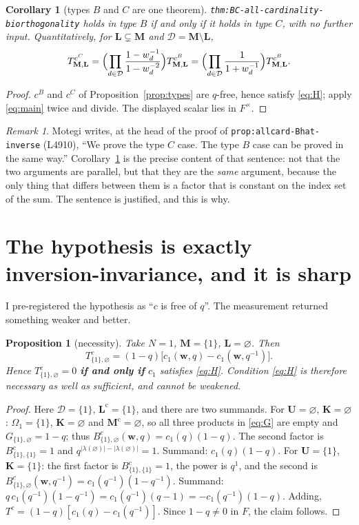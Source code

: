 \documentclass[11pt]{article}
\theoremstyle{plain}
\newtheorem{prop}[thm]{Proposition}
\newtheorem{cor}[thm]{Corollary}
\theoremstyle{definition}
\theoremstyle{remark}
\newtheorem{rem}[thm]{Remark}
\newcommand{\bM}{\mathbf M}
\newcommand{\bK}{\mathbf K}
\newcommand{\bL}{\mathbf L}
\newcommand{\bU}{\mathbf U}
\newcommand{\bw}{\mathbf w}
\newcommand{\cD}{\mathcal D}
\newcommand{\cm}{{\mathrm c}}
\begin{document}
\begin{cor}[types $B$ and $C$ are one theorem]
\label{cor:BC}
\texttt{thm:BC-all-cardinality-biorthogonality} holds in type $B$ if and only if
it holds in type $C$, with no further input. Quantitatively, for
$\bL\subsetneq\bM$ and $\cD=\bM\setminus\bL$,
\[
T^{c^C}_{\bM,\bL}
=\Bigl(\prod_{d\in\cD}\frac{1-w_d^{-1}}{1-w_d^{-2}}\Bigr)T^{c^B}_{\bM,\bL}
=\Bigl(\prod_{d\in\cD}\frac1{1+w_d^{-1}}\Bigr)T^{c^B}_{\bM,\bL}.
\]
\end{cor}

\begin{proof}
$c^B$ and $c^C$ of Proposition~\ref{prop:types} are $q$-free, hence satisfy
\eqref{eq:H}; apply \eqref{eq:main} twice and divide. The displayed scalar lies in
$F^\times$.
\end{proof}

\begin{rem}
Motegi writes, at the head of the proof of \texttt{prop:allcard-Bhat-inverse}
(L4910), ``We prove the type $C$ case. The type $B$ case can be proved in the same
way.'' Corollary~\ref{cor:BC} is the precise content of that sentence: not that
the two arguments are parallel, but that they are the \emph{same} argument, because
the only thing that differs between them is a factor that is constant on the index
set of the sum. The sentence is justified, and this is why.
\end{rem}

\section{The hypothesis is exactly inversion-invariance, and it is sharp}
\label{sec:sharp}

I pre-registered the hypothesis as ``$c$ is free of $q$''. The measurement
returned something weaker and better.

\begin{prop}[necessity]
\label{prop:sharp}
Take $N=1$, $\bM=\{1\}$, $\bL=\varnothing$. Then
\[
T^c_{\{1\},\varnothing}=(1-q)\bigl[c_1(\bw,q)-c_1(\bw,q^{-1})\bigr].
\]
Hence $T^c_{\{1\},\varnothing}=0$ \textbf{if and only if} $c_1$ satisfies
\eqref{eq:H}. Condition \eqref{eq:H} is therefore necessary as well as
sufficient, and cannot be weakened.
\end{prop}

\begin{proof}
Here $\cD=\{1\}$, $\bL^\cm=\{1\}$, and there are two summands.
For $\bU=\varnothing$, $\bK=\varnothing$: $\Omega_1=\{1\}$, $\bK=\varnothing$ and
$\bM^\cm=\varnothing$, so all three products in \eqref{eq:G} are empty and
$G_{\{1\},\varnothing}=1-q$; thus $B^c_{\{1\},\varnothing}(\bw,q)=c_1(q)(1-q)$.
The second factor is $B^c_{\{1\},\{1\}}=1$ and $q^{|\lambda(\varnothing)|-|\lambda(\varnothing)|}=1$.
Summand: $c_1(q)(1-q)$.
For $\bU=\{1\}$, $\bK=\{1\}$: the first factor is $B^c_{\{1\},\{1\}}=1$, the power is
$q^{1}$, and the second is $B^c_{\{1\},\varnothing}(\bw,q^{-1})=c_1(q^{-1})(1-q^{-1})$.
Summand: $q\,c_1(q^{-1})(1-q^{-1})=c_1(q^{-1})(q-1)=-c_1(q^{-1})(1-q)$.
Adding, $T^c=(1-q)[c_1(q)-c_1(q^{-1})]$. Since $1-q\ne0$ in $F$, the claim follows.
\end{proof}
\end{document}
